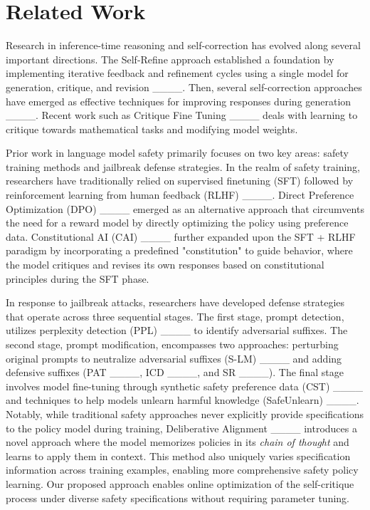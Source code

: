 \section{Related Work}
Research in inference-time reasoning and self-correction has evolved along several important directions. The Self-Refine approach established a foundation by implementing iterative feedback and refinement cycles using a single model for generation, critique, and revision ____. Then, several self-correction approaches have emerged as effective techniques for improving responses during generation ____. Recent work such as Critique Fine Tuning ____ deals with learning to critique towards mathematical tasks and modifying model weights.

Prior work in language model safety primarily focuses on two key areas: safety training methods and jailbreak defense strategies. In the realm of safety training, researchers have traditionally relied on supervised finetuning (SFT) followed by reinforcement learning from human feedback (RLHF) ____. Direct Preference Optimization (DPO) ____ emerged as an alternative approach that circumvents the need for a reward model by directly optimizing the policy using preference data. Constitutional AI (CAI) ____ further expanded upon the SFT + RLHF paradigm by incorporating a predefined "constitution" to guide behavior, where the model critiques and revises its own responses based on constitutional principles during the SFT phase.

In response to jailbreak attacks, researchers have developed defense strategies that operate across three sequential stages. The first stage, prompt detection, utilizes perplexity detection (PPL) ____ to identify adversarial suffixes. The second stage, prompt modification, encompasses two approaches: perturbing original prompts to neutralize adversarial suffixes (S-LM) ____ and adding defensive suffixes (PAT ____, ICD ____, and SR ____). The final stage involves model fine-tuning through synthetic safety preference data (CST) ____ and techniques to help models unlearn harmful knowledge (SafeUnlearn) ____. Notably, while traditional safety approaches never explicitly provide specifications to the policy model during training, Deliberative Alignment ____ introduces a novel approach where the model memorizes policies in its \emph{chain of thought} and learns to apply them in context. This method also uniquely varies specification information across training examples, enabling more comprehensive safety policy learning. Our proposed approach enables online optimization of the self-critique process under diverse safety specifications without requiring parameter tuning.